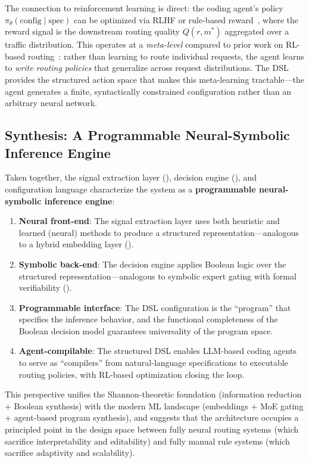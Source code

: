 The connection to reinforcement learning is direct: the coding agent's policy $\pi_\theta(\text{config} \mid \text{spec})$ can be optimized via RLHF or rule-based reward~\cite{zhang2025routerr1}, where the reward signal is the downstream routing quality $Q(r, m^*)$ aggregated over a traffic distribution.
This operates at a \emph{meta-level} compared to prior work on RL-based routing~\cite{zhang2025routerr1}: rather than learning to route individual requests, the agent learns to \emph{write routing policies} that generalize across request distributions.
The DSL provides the structured action space that makes this meta-learning tractable---the agent generates a finite, syntactically constrained configuration rather than an arbitrary neural network.

\subsection{Synthesis: A Programmable Neural-Symbolic Inference Engine}

Taken together, the signal extraction layer (), decision engine (), and configuration language characterize the system as a \textbf{programmable neural-symbolic inference engine}:

\begin{enumerate}
  \item \textbf{Neural front-end}: The signal extraction layer uses both heuristic and learned (neural) methods to produce a structured representation---analogous to a hybrid embedding layer ().
  \item \textbf{Symbolic back-end}: The decision engine applies Boolean logic over the structured representation---analogous to symbolic expert gating with formal verifiability ().
  \item \textbf{Programmable interface}: The DSL configuration is the ``program'' that specifies the inference behavior, and the functional completeness of the Boolean decision model guarantees universality of the program space.
  \item \textbf{Agent-compilable}: The structured DSL enables LLM-based coding agents to serve as ``compilers'' from natural-language specifications to executable routing policies, with RL-based optimization closing the loop.
\end{enumerate}

This perspective unifies the Shannon-theoretic foundation (information reduction + Boolean synthesis) with the modern ML landscape (embeddings + MoE gating + agent-based program synthesis), and suggests that the architecture occupies a principled point in the design space between fully neural routing systems (which sacrifice interpretability and editability) and fully manual rule systems (which sacrifice adaptivity and scalability).
